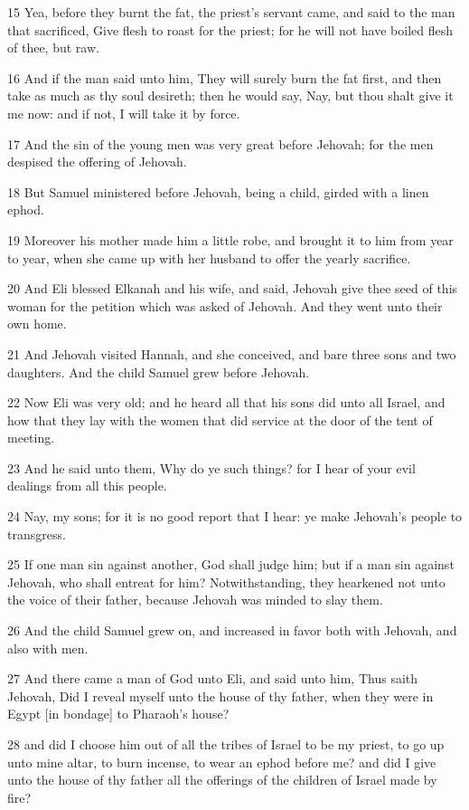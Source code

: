 \par 15 Yea, before they burnt the fat, the priest's servant came, and said to the man that sacrificed, Give flesh to roast for the priest; for he will not have boiled flesh of thee, but raw.
\par 16 And if the man said unto him, They will surely burn the fat first, and then take as much as thy soul desireth; then he would say, Nay, but thou shalt give it me now: and if not, I will take it by force.
\par 17 And the sin of the young men was very great before Jehovah; for the men despised the offering of Jehovah.
\par 18 But Samuel ministered before Jehovah, being a child, girded with a linen ephod.
\par 19 Moreover his mother made him a little robe, and brought it to him from year to year, when she came up with her husband to offer the yearly sacrifice.
\par 20 And Eli blessed Elkanah and his wife, and said, Jehovah give thee seed of this woman for the petition which was asked of Jehovah. And they went unto their own home.
\par 21 And Jehovah visited Hannah, and she conceived, and bare three sons and two daughters. And the child Samuel grew before Jehovah.
\par 22 Now Eli was very old; and he heard all that his sons did unto all Israel, and how that they lay with the women that did service at the door of the tent of meeting.
\par 23 And he said unto them, Why do ye such things? for I hear of your evil dealings from all this people.
\par 24 Nay, my sons; for it is no good report that I hear: ye make Jehovah's people to transgress.
\par 25 If one man sin against another, God shall judge him; but if a man sin against Jehovah, who shall entreat for him? Notwithstanding, they hearkened not unto the voice of their father, because Jehovah was minded to slay them.
\par 26 And the child Samuel grew on, and increased in favor both with Jehovah, and also with men.
\par 27 And there came a man of God unto Eli, and said unto him, Thus saith Jehovah, Did I reveal myself unto the house of thy father, when they were in Egypt [in bondage] to Pharaoh's house?
\par 28 and did I choose him out of all the tribes of Israel to be my priest, to go up unto mine altar, to burn incense, to wear an ephod before me? and did I give unto the house of thy father all the offerings of the children of Israel made by fire?
